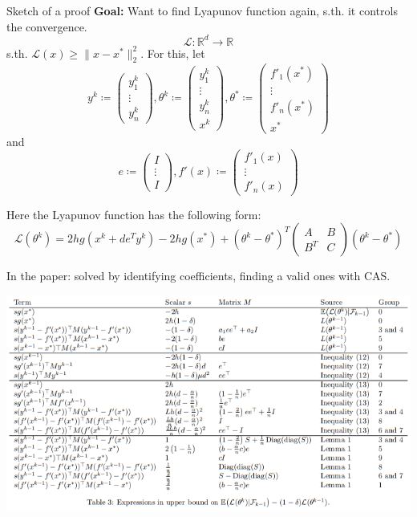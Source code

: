 \documentclass{beamer}
\numberwithin{equation}{aufgabe}
\newcommand\R{\mathbb R}
\begin{document}
\begin{frame}{Sketch of a proof}
    \textbf{Goal:} Want to find Lyapunov function again, s.th. it controls the convergence. \\ \pause
    $$\mathcal{L}: \R^d \to \R$$
    s.th. $\mathcal{L}(x) \geq \|x - x^*\|_2^2$. \pause
    For this, let
    $$y^k \coloneqq \begin{pmatrix} y_1^k \\ \vdots \\ y_n^k \end{pmatrix}, \theta^k \coloneqq \begin{pmatrix} y_1^k \\ \vdots \\ y_n^k \\ x^k \end{pmatrix}, \theta^* \coloneqq \begin{pmatrix}  f'_1(x^*) \\ \vdots \\ f'_n(x^*) \\ x^* \end{pmatrix}$$ and 
    $$e \coloneqq \begin{pmatrix} I \\ \vdots \\ I \end{pmatrix}, f'(x) \coloneqq \begin{pmatrix} f'_1(x) \\ \vdots \\ f'_n(x) \end{pmatrix}$$
\end{frame}
\begin{frame}
    \begin{block}{}
        Here the Lyapunov function has the following form:
        $$\mathcal{L}(\theta^k) = 2hg(x^k+de^Ty^k) - 2hg(x^*) + (\theta^k - \theta^*)^T\begin{pmatrix}
            A &B \\ B^T & C
        \end{pmatrix}(\theta^k - \theta^*)$$
    \end{block}
    \pause
    In the paper: solved by identifying coefficients, finding a valid ones with CAS.
\end{frame}

\begin{frame}
    \includegraphics[width=\textwidth]{images/coefficients.png}
\end{frame}
\end{document}
